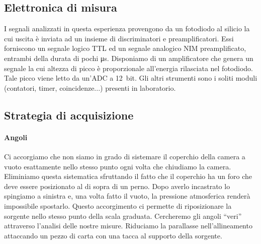 \subsection{Elettronica di misura}


I segnali analizzati in questa esperienza provengono da un fotodiodo al silicio la cui uscita è inviata ad un insieme di discriminatori e preamplificatori. Essi forniscono un segnale logico TTL ed un segnale analogico NIM preamplificato, entrambi della durata di pochi \si{\micro s}.
Disponiamo di un amplificatore che genera un segnale la cui altezza di picco è proporzionale all'energia rilasciata nel fotodiodo.
Tale picco viene letto da un'ADC a \SI{12}{bit}. Gli altri strumenti sono i soliti moduli (contatori, timer, coincidenze...) presenti in laboratorio.

\subsection{Strategia di acquisizione}

\paragraph{Angoli}
Ci accorgiamo che non siamo in grado di sistemare il coperchio della camera a vuoto esattamente nello stesso punto ogni volta che chiudiamo la camera. Eliminiamo questa sistematica sfruttando il fatto che il coperchio ha un foro che deve essere posizionato al di sopra di un perno. Dopo averlo incastrato lo spingiamo a sinistra e, una volta fatto il vuoto, la pressione atmosferica renderà impossibile spostarlo.
Questo accorgimento ci permette di riposizionare la sorgente nello stesso punto della scala graduata. Cercheremo gli angoli ``veri'' attraverso l'analisi delle nostre misure.
Riduciamo la parallasse nell'allineamento attaccando un pezzo di carta con una tacca al supporto della sorgente.

